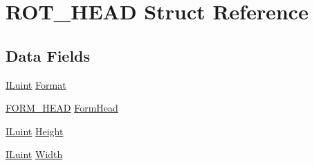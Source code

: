 \hypertarget{struct_r_o_t___h_e_a_d}{\section{R\-O\-T\-\_\-\-H\-E\-A\-D Struct Reference}
\label{struct_r_o_t___h_e_a_d}
}
\subsection*{Data Fields}
\begin{DoxyCompactItemize}
\item 
\hyperlink{il_8h_ac6508d0e9c19e32f32e00d54b5b8cf30}{I\-Luint} \hyperlink{struct_r_o_t___h_e_a_d_a423d6848d970265bc43946f795923316}{Format}
\item 
\hyperlink{struct_f_o_r_m___h_e_a_d}{F\-O\-R\-M\-\_\-\-H\-E\-A\-D} \hyperlink{struct_r_o_t___h_e_a_d_a90e6ff076ed506706ec0785ffc17f6b1}{Form\-Head}
\item 
\hyperlink{il_8h_ac6508d0e9c19e32f32e00d54b5b8cf30}{I\-Luint} \hyperlink{struct_r_o_t___h_e_a_d_a8a8093d76b61a95fc96df24af29b107a}{Height}
\item 
\hyperlink{il_8h_ac6508d0e9c19e32f32e00d54b5b8cf30}{I\-Luint} \hyperlink{struct_r_o_t___h_e_a_d_a4146e7b2b0b4097e0e335f9b348392bf}{Width}
\end{DoxyCompactItemize}


